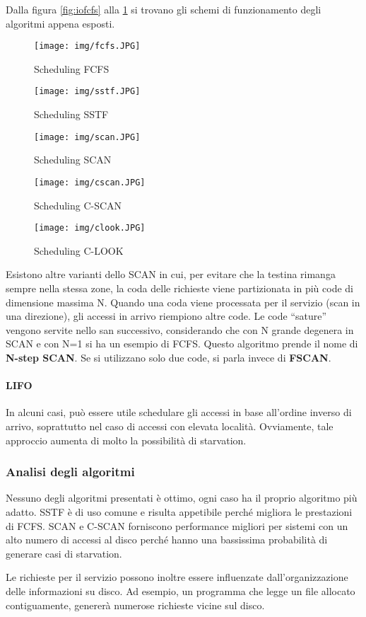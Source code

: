 \documentclass[a4]{article}
\begin{document}
Dalla figura \ref{fig:iofcfs} alla \ref{fig:ioclook} si trovano gli schemi di funzionamento degli algoritmi appena esposti.

\begin{figure}
    \centering
    \texttt{[image: img/fcfs.JPG]}
    \label{fig:iofcfs}
    \caption{Scheduling FCFS}
    \texttt{[image: img/sstf.JPG]}
    \caption{Scheduling SSTF}
    \texttt{[image: img/scan.JPG]}
    \caption{Scheduling SCAN}
    \texttt{[image: img/cscan.JPG]}
    \caption{Scheduling C-SCAN}
    \texttt{[image: img/clook.JPG]}
    \caption{Scheduling C-LOOK}
    \label{fig:ioclook}
\end{figure}

Esistono altre varianti dello SCAN in cui, per evitare che la testina rimanga sempre nella stessa zone, la coda delle richieste viene partizionata in più code di dimensione massima N. Quando una coda viene processata per il servizio (scan in una direzione), gli accessi in arrivo riempiono altre code. Le code ``sature'' vengono servite nello san successivo, considerando che con N grande degenera in SCAN e con N=1 si ha un esempio di FCFS. Questo algoritmo prende il nome di \textbf{N-step SCAN}. Se si utilizzano solo due code, si parla invece di \textbf{FSCAN}.

\paragraph{LIFO} In alcuni casi, può essere utile schedulare gli accessi in base all'ordine inverso di arrivo, soprattutto nel caso di accessi con elevata località. Ovviamente, tale approccio aumenta di molto la possibilità di starvation.

\subsubsection{Analisi degli algoritmi}
Nessuno degli algoritmi presentati è ottimo, ogni caso ha il proprio algoritmo più adatto. SSTF è di uso comune e risulta appetibile perché migliora le prestazioni di FCFS. SCAN e C-SCAN forniscono performance migliori per sistemi con un alto numero di accessi al disco perché hanno una bassissima probabilità di generare casi di starvation.

Le richieste per il servizio possono inoltre essere influenzate dall'organizzazione delle informazioni su disco. Ad esempio, un programma che legge un file allocato contiguamente, genererà numerose richieste vicine sul disco.
\end{document}
